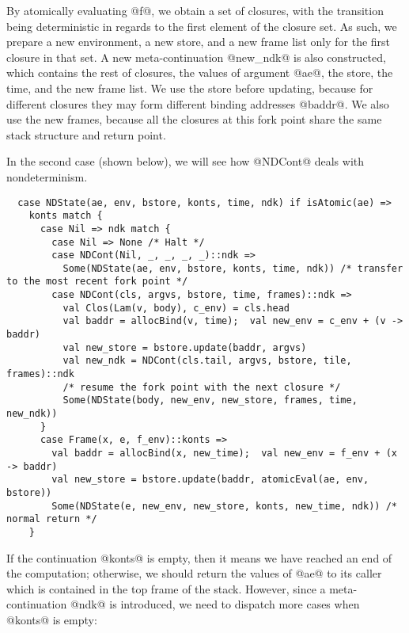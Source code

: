 \documentclass[acmsmall, review]{acmart}\settopmatter{}
\begin{document}
By atomically evaluating @f@, we obtain a set of closures, with the transition being 
deterministic in regards to the first element of the closure set.
As such, we prepare a new environment, a new store, and a new frame list only for the
first closure in that set. A new meta-continuation @new_ndk@ is also constructed,
which contains the rest of closures, the values of argument @ae@, the store, the time,
and the new frame list. We use the store before updating, because for different closures
they may form different binding addresses @baddr@. We also use the new frames, because
all the closures at this fork point share the same stack structure and return point.

In the second case (shown below), we will see how @NDCont@ deals with nondeterminism.

\begin{lstlisting}
  case NDState(ae, env, bstore, konts, time, ndk) if isAtomic(ae) =>
    konts match {
      case Nil => ndk match {
        case Nil => None /* Halt */
        case NDCont(Nil, _, _, _, _)::ndk =>
          Some(NDState(ae, env, bstore, konts, time, ndk)) /* transfer to the most recent fork point */
        case NDCont(cls, argvs, bstore, time, frames)::ndk =>
          val Clos(Lam(v, body), c_env) = cls.head
          val baddr = allocBind(v, time);  val new_env = c_env + (v -> baddr)
          val new_store = bstore.update(baddr, argvs)
          val new_ndk = NDCont(cls.tail, argvs, bstore, tile, frames)::ndk
          /* resume the fork point with the next closure */
          Some(NDState(body, new_env, new_store, frames, time, new_ndk))
      }
      case Frame(x, e, f_env)::konts =>
        val baddr = allocBind(x, new_time);  val new_env = f_env + (x -> baddr)
        val new_store = bstore.update(baddr, atomicEval(ae, env, bstore))
        Some(NDState(e, new_env, new_store, konts, new_time, ndk)) /* normal return */
    }
\end{lstlisting}

If the continuation @konts@ is empty, then it means we have reached an end of the computation;
otherwise, we should return the values of @ae@ to its caller which is contained in the top
frame of the stack. However, since a meta-continuation @ndk@ is introduced, we need to dispatch
more cases when @konts@ is empty:
\end{document}
